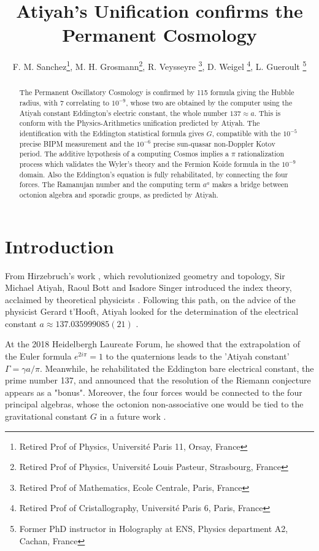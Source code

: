 \documentclass[a4paper,9pt]{article}
\title{Atiyah's Unification confirms the Permanent Cosmology}
\author{F. M. Sanchez\thanks{Retired Prof of Physics, Universit\'{e} Paris 11, Orsay, France}, M. H. Grosmann\thanks{Retired Prof of Physics, Universit\'{e} Louis Pasteur, Strasbourg, France}, R. Veysseyre \thanks{Retired Prof of Mathematics, Ecole Centrale, Paris, France}, D. Weigel \thanks{Retired Prof of Cristallography, Universit\'{e} Paris 6, Paris, France}, L. Gueroult \thanks{Former PhD instructor in Holography at ENS, Physics department A2, Cachan, France}}
\begin{document}
\setcounter{page}{1}

\maketitle

\begin{abstract}
The Permanent Oscillatory Cosmology is confirmed by 115 formula giving the Hubble radius, with 7 correlating to $10^{-9}$, whose two are obtained by the computer using the Atiyah constant Eddington's electric constant, the whole number $137 \approx a $. This is conform with the Physics-Arithmetics unification predicted by Atiyah. The identification with the Eddington statistical formula gives $G$, compatible with the $10^{-5}$ precise BIPM measurement and the $10^{-6}$ precise sun-quasar non-Doppler Kotov period. The additive hypothesis of a computing Cosmos implies a $\pi$ rationalization process which validates the Wyler's theory and the Fermion Koide formula in the $10^{-9}$ domain. Also the Eddington's equation is fully rehabilitated, by connecting the four forces. The Ramanujan number and the computing term $a^a$ makes a bridge between octonion algebra and sporadic groups, as predicted by Atiyah.   
\end{abstract}





\label{sec:headings}

\section{Introduction}
  
    From Hirzebruch's work \cite{Hirzebruch}, which revolutionized geometry and topology, Sir Michael Atiyah, Raoul Bott \cite{Bott} and Isadore Singer \cite{Singer} introduced the index theory, acclaimed by theoretical physicists \cite{Alvarez}. Following this path, on the advice of the physicist Gerard t'Hooft, Atiyah looked for the determination of the electrical constant $a \approx 137.035999085(21)$ \cite{Atiyah}.
    
    
    At the 2018 Heidelbergh Laureate Forum, he showed that the extrapolation of the Euler formula  $e^{2i\pi} = 1$ to the quaternions leads to the 'Atiyah constant' $\Gamma = \gamma a/\pi $. Meanwhile, he rehabilitated the Eddington \cite{Eddington} bare electrical constant, the prime number 137, and announced that the resolution of the Riemann conjecture appears as a "bonus". Moreover, the four forces would be connected to the four principal algebras, whose the octonion non-associative one would be tied to the gravitational constant $G$ in a future work \cite{Atiyah}. 
    
\end{document}

